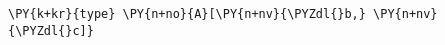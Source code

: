 \begin{Verbatim}[commandchars=\\\{\}]
\PY{k+kr}{type} \PY{n+no}{A}[\PY{n+nv}{\PYZdl{}b,} \PY{n+nv}{\PYZdl{}c]}
\end{Verbatim}
